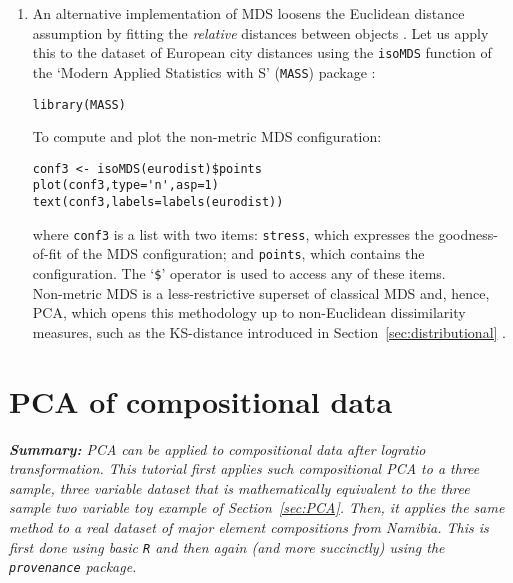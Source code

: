 \documentclass[11pt]{article}
\begin{document}
\begin{enumerate}
\item\label{it:nonmetricMDS} An alternative implementation of MDS
  loosens the Euclidean distance assumption by fitting the
  \emph{relative} distances between objects \citep{shepard1962,
    kruskal1978}. Let us apply this to the dataset of European city
  distances using the \texttt{isoMDS} function of the `Modern Applied
  Statistics with S' (\texttt{MASS}) package \citep{ripley2002}:

\begin{verbatim}
library(MASS)
\end{verbatim}

To compute and plot the non-metric MDS configuration:
  
\begin{verbatim}
conf3 <- isoMDS(eurodist)$points
plot(conf3,type='n',asp=1)
text(conf3,labels=labels(eurodist))
\end{verbatim}

  where \texttt{conf3} is a list with two items: \texttt{stress},
  which expresses the goodness-of-fit of the MDS configuration; and
  \texttt{points}, which contains the configuration. The `\texttt{\$}'
  operator is used to access any of these items.\\
  
  Non-metric MDS is a less-restrictive superset of classical MDS and,
  hence, PCA, which opens this methodology up to non-Euclidean
  dissimilarity measures, such as the KS-distance introduced in
  Section~\ref{sec:distributional} \citep{vermeesch2013}.

\end{enumerate}

\section{PCA of compositional data}
\label{sec:compositionalPCA}

\textit{\textbf{Summary:} PCA can be applied to compositional data
  after logratio transformation. This tutorial first applies such
  compositional PCA to a three sample, three variable dataset that is
  mathematically equivalent to the three sample two variable toy
  example of Section~\ref{sec:PCA}. Then, it applies the same method
  to a real dataset of major element compositions from Namibia. This
  is first done using basic \textnormal{\texttt{R}} and then again
  (and more succinctly) using the \textnormal{\texttt{provenance}}
  package.}\\
\end{document}
